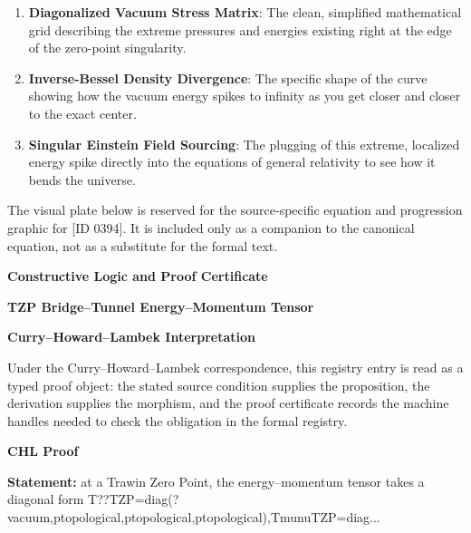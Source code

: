 \begin{enumerate}[leftmargin=1.6em,itemsep=6pt,topsep=4pt]
\item \textbf{Diagonalized Vacuum Stress Matrix}: The clean, simplified mathematical grid describing the extreme pressures and energies existing right at the edge of the zero-point singularity.
\item \textbf{Inverse-Bessel Density Divergence}: The specific shape of the curve showing how the vacuum energy spikes to infinity as you get closer and closer to the exact center.
\item \textbf{Singular Einstein Field Sourcing}: The plugging of this extreme, localized energy spike directly into the equations of general relativity to see how it bends the universe.
\end{enumerate}

\begingroup\footnotesize\sloppy
The visual plate below is reserved for the source-specific equation and progression graphic for [ID 0394]. It is included only as a companion to the canonical equation, not as a substitute for the formal text.
\par\endgroup
\ifTZPDarkEdition
{}
\fi

\clearpage
\begingroup\tzpsupportsetup
\noindent\textbf{\fontsize{10.8pt}{12.8pt}\selectfont [ID 0394] Constructive Logic and Proof Certificate}\par
\noindent\textbf{\fontsize{10pt}{12pt}\selectfont TZP Bridge--Tunnel Energy--Momentum Tensor}\par
\vspace{0.45em}
\begingroup
\footnotesize
\setlength{\parskip}{0.22em}
\setlength{\parindent}{0pt}
\noindent\textbf{Curry--Howard--Lambek Interpretation}\par
Under the Curry--Howard--Lambek correspondence, this registry entry is read as a typed proof
object: the stated source condition supplies the proposition, the derivation supplies the
morphism, and the proof certificate records the machine handles needed to check the obligation
in the formal registry.

\vspace{0.45em}
\noindent\textbf{CHL Proof}\par
\textbf{Statement:} at a Trawin Zero Point, the energy--momentum tensor takes a diagonal form
T??TZP=diag(?vacuum,ptopological,ptopological,ptopological),TmunuTZP=diag...

